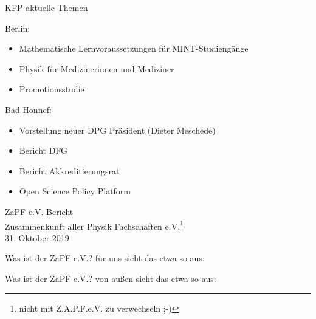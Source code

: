 \documentclass[compress, aspectratio=169]{beamer}
\begin{document}
 
 \begin{frame}{KFP aktuelle Themen}
 
  Berlin:
  \begin{itemize}
   \item Mathematische Lernvoraussetzungen für MINT-Studiengänge
   \item Physik für Medizinerinnen und Mediziner
   \item Promotionsstudie
  \end{itemize}
  
  \bigskip
  
  Bad Honnef:
  \begin{itemize}
   \item Vorstellung neuer DPG Präsident (Dieter Meschede)
   \item Bericht DFG 
   \item Bericht Akkreditierungsrat 
   \item Open Science Policy Platform 
  \end{itemize}
 \end{frame}


\thispagestyle{empty}
\begin{frame}
  \begin{center}
    \Large{ ZaPF e.V. Bericht }\\
    \vspace{1cm}
    \large Zusammenkunft aller Physik Fachschaften e.V.\footnote{nicht mit Z.A.P.F.e.V. zu verwechseln ;-)}\\
    \vspace{0.5cm}
    \normalsize 31. Oktober 2019
  \end{center}
\end{frame}

\thispagestyle{empty}
\begin{frame}{Was ist der ZaPF e.V.?}
für uns sieht das etwa so aus: \\
  \begin{center}
  \end{center}
\end{frame}

\thispagestyle{empty}
\begin{frame}{Was ist der ZaPF e.V.?}
von außen sieht das etwa so aus: \\
  \begin{center}
  \end{center}
\end{frame}
\end{document}
